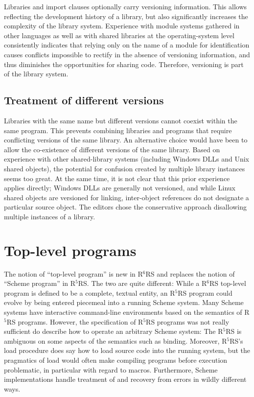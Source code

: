 \documentclass[twoside,twocolumn]{algol60}
\newcommand{\rn}[1]{R$^{#1}$RS}
\begin{document}
Libraries and {\cf import} clauses optionally carry versioning
information.  This allows reflecting the development history of a
library, but also significantly increases the complexity of the
library system.  Experience with module systems gathered in other
languages as well as with shared libraries at the operating-system
level consistently indicates that relying only on the name of a module
for identification causes conflicts impossible to rectify in the
absence of versioning information, and thus diminishes the
opportunities for sharing code.  Therefore, versioning is part of the
library system.

\section{Treatment of different versions}

Libraries with the same name but different versions cannot coexist
within the same program.  This prevents combining libraries and
programs that require conflicting versions of the same library.  An
alternative choice would have been to allow the co-existence of
different versions of the same library.  Based on experience with
other shared-library systems (including Windows DLLs and Unix shared
objects), the potential for confusion created by multiple library
instances seems too great. At the same time, it is not clear that this
prior experience applies directly; Windows DLLs are generally not
versioned, and while Linux shared objects are versioned for linking,
inter-object references do not designate a particular source object.
The editors chose the conservative approach disallowing multiple
instances of a library.

\chapter{Top-level programs}

The notion of ``top-level program'' is new in \rn{6} and replaces the
notion of ``Scheme program'' in \rn{5}.  The two are quite different:
While a \rn{6} top-level program is defined to be a complete, textual
entity, an \rn{5} program could evolve by being entered piecemeal into
a running Scheme system.  Many Scheme systems have interactive
command-line environments based on the semantics of \rn{5} programs.
However, the specification of \rn{5} programs was not really
sufficient do describe how to operate an arbitrary Scheme system: The
\rn{5} is ambiguous on some aspects of the semantics such as binding.
Moreover, \rn{5}'s {\cf load} procedure does say how to load source
code into the running system, but the pragmatics of {\cf load} would
often make compiling programs before execution problematic, in
particular with regard to macros.  Furthermore, Scheme implementations
handle treatment of and recovery from errors in wildly different ways.
\end{document}
